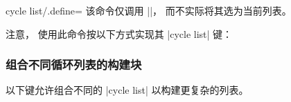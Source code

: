 \begin{pgfplotskey}{cycle list/.define=}
    该命令仅调用
    |\pgfplotscreateplotcyclelist|\allowbreak{}\allowbreak{}，
    而不实际将其选为当前列表。

    注意，\PGFPlots{} 使用此命令按以下方式实现其 |cycle list| 键：
\begin{codeexample}
\end{codeexample}
\end{pgfplotskey}


\subsubsection{组合不同循环列表的构建块}

以下键允许组合不同的 |cycle list| 以构建更复杂的列表。

